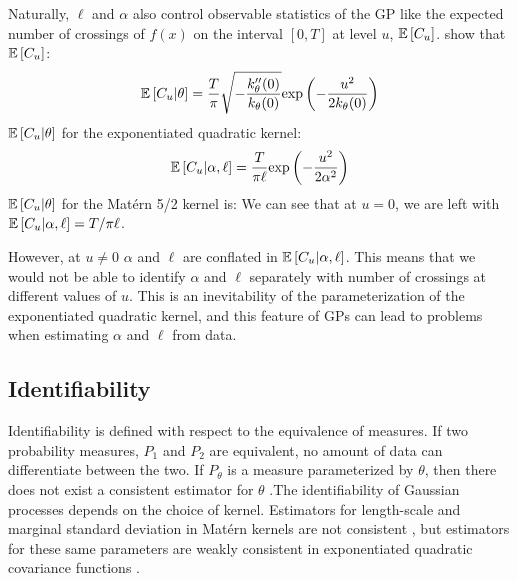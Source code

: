 \documentclass{article}
\newcommand{\Exp}[1]{\ensuremath{\mathbb{E} \lb #1 \rb}}
\newcommand{\lb}{\ensuremath{\left[}}
\newcommand{\rb}{\ensuremath{\right]}}
\begin{document}
Naturally, $\ell$ and $\alpha$ also control observable statistics of the
GP like the expected number of crossings of $f(x)$ on the interval $[0,
T]$ at level $u$, $\Exp{C_u}$. \citet{cramer2004stationary} show that $\Exp{C_u}$:
\begin{align*} 
  \Exp{C_u | \theta} = \dfrac{T}{\pi} 
\sqrt{-\dfrac{k_\theta^{\prime \prime}(0)}{k_\theta(0)}}
  \text{exp}\left(-\dfrac{u^2}{2k_\theta(0)}\right)
\end{align*} 
$\Exp{C_u | \theta}$ for the exponentiated quadratic kernel:
\begin{align*} 
  \Exp{C_u | \alpha, \ell} = \dfrac{T}{\pi \ell}\text{exp}\left(-\dfrac{u^2}{2 \alpha ^ 2} \right)
\end{align*} 
$\Exp{C_u | \theta}$ for the Mat\'{e}rn 5/2 kernel is:
We can see that at $u = 0$, we are left with $\Exp{C_u | \alpha, \ell} = T / \pi \ell$.  

However, at $u \neq 0$ $\alpha$ and $\ell$ are conflated in $\Exp{C_u | \alpha,
\ell}$.  This means that we would not be able to identify $\alpha$ and $\ell$
separately with number of crossings at different values of $u$.  This is an
inevitability of the parameterization of the exponentiated quadratic kernel,
and this feature of GPs can lead to problems when estimating $\alpha$ and
$\ell$ from data.

\subsection{Identifiability}

Identifiability is defined with respect to the equivalence of measures. If two
probability measures, $P_1$ and $P_2$ are equivalent, no amount of data can
differentiate between the two. If $P_\theta$ is a measure parameterized by
$\theta$, then there does not exist a consistent estimator for $\theta$
\citet{zhang2004inconsistent}.The identifiability of Gaussian processes depends
on the choice of kernel.  Estimators for length-scale and marginal standard
deviation in Mat\'{e}rn kernels are not consistent
\cite{zhang2004inconsistent}, but estimators for these same parameters are
weakly consistent in exponentiated quadratic covariance functions
\cite{abt1998fisher}. 
\end{document}
